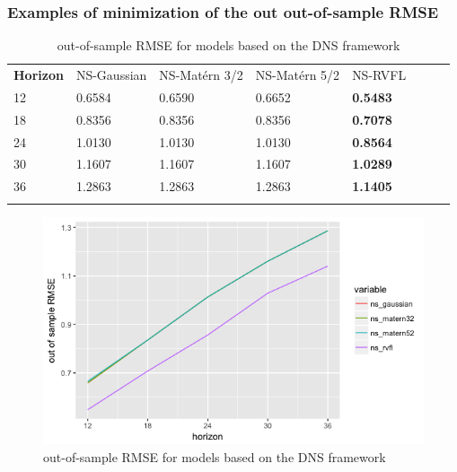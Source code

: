 \subsubsection{Examples of minimization of the out out-of-sample RMSE}


\begin{table}[!htb]
\begin{center}
\caption{out-of-sample RMSE for models based on the DNS framework}
\label{tab:min_value_ns}       %
\begin{tabular}{llllllll}
\hline\noalign{\smallskip}
\textbf{Horizon} & NS-Gaussian & NS-Mat\'ern 3/2  & NS-Mat\'ern 5/2 & NS-RVFL \\
\noalign{\smallskip}\hline\noalign{\smallskip}
 12 & 0.6584  &  0.6590   &   0.6652 & \textbf{0.5483} \\
 18 & 0.8356  &  0.8356   &   0.8356 & \textbf{0.7078} \\
 24 & 1.0130  &  1.0130   &   1.0130 & \textbf{0.8564}\\
 30 & 1.1607  &  1.1607   &   1.1607 & \textbf{1.0289} \\
 36 & 1.2863  &  1.2863   &   1.2863 & \textbf{1.1405} \\
\noalign{\smallskip}\hline
\end{tabular}
\end{center}
\end{table}

\begin{figure}[!htb]
\centering
\includegraphics[width=12cm]{gfx/chapter-bayesianrvfl/oos_ns_krls.png}
\caption{out-of-sample RMSE for models based on the DNS framework}
\label{oos_ns_krls}
\end{figure}

